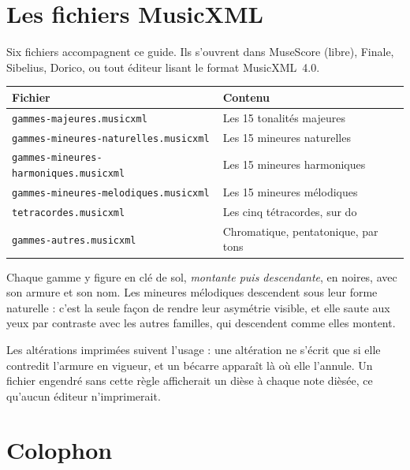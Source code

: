 \documentclass[a4paper,11pt]{article}
\begin{document}
\section{Les fichiers MusicXML}
\label{sec:musicxml}

Six fichiers accompagnent ce guide. Ils s'ouvrent dans MuseScore (libre),
Finale, Sibelius, Dorico, ou tout éditeur lisant le format MusicXML~4.0.

\begin{center}
\begin{tabular}{@{}l l@{}}
\toprule
\textbf{Fichier} & \textbf{Contenu} \\
\midrule
\texttt{gammes-majeures.musicxml} & Les 15 tonalités majeures \\
\texttt{gammes-mineures-naturelles.musicxml} & Les 15 mineures naturelles \\
\texttt{gammes-mineures-harmoniques.musicxml} & Les 15 mineures harmoniques \\
\texttt{gammes-mineures-melodiques.musicxml} & Les 15 mineures mélodiques \\
\texttt{tetracordes.musicxml} & Les cinq tétracordes, sur do \\
\texttt{gammes-autres.musicxml} & Chromatique, pentatonique, par tons \\
\bottomrule
\end{tabular}
\end{center}

Chaque gamme y figure en clé de sol, \emph{montante puis descendante}, en
noires, avec son armure et son nom. Les mineures mélodiques descendent sous leur forme
naturelle : c'est la seule façon de rendre leur asymétrie visible, et elle
saute aux yeux par contraste avec les autres familles, qui descendent comme
elles montent.

\begin{remarque}
Les altérations imprimées suivent l'usage : une altération ne s'écrit que si
elle contredit l'armure en vigueur, et un bécarre apparaît là où elle
l'annule. Un fichier engendré sans cette règle afficherait un dièse à chaque
note dièsée, ce qu'aucun éditeur n'imprimerait.
\end{remarque}

\section*{Colophon}
\end{document}
